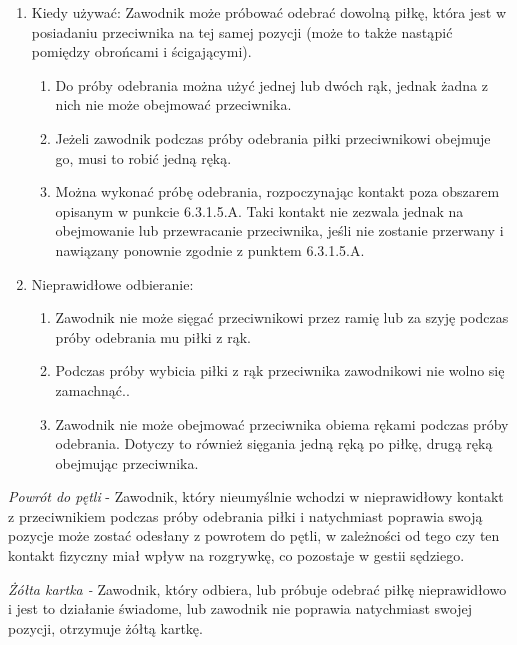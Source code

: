 \documentclass[12pt]{article}
\begin{document}
\begin{enumerate}
	\item
	      Kiedy używać: Zawodnik może próbować odebrać dowolną piłkę, która jest
	      w posiadaniu przeciwnika na tej samej pozycji (może to także nastąpić
	      pomiędzy obrońcami i ścigającymi).

	      \begin{enumerate}
		      \item
		            Do próby odebrania można użyć jednej lub dwóch rąk, jednak żadna z
		            nich nie może obejmować przeciwnika.
		      \item
		            Jeżeli zawodnik podczas próby odebrania piłki przeciwnikowi obejmuje
		            go, musi to robić jedną ręką.
		      \item
		            Można wykonać próbę odebrania, rozpoczynając kontakt poza obszarem
		            opisanym w punkcie 6.3.1.5.A. Taki kontakt nie zezwala jednak na
		            obejmowanie lub przewracanie przeciwnika, jeśli nie zostanie
		            przerwany i nawiązany ponownie zgodnie z punktem 6.3.1.5.A.
	      \end{enumerate}
	\item
	      Nieprawidłowe odbieranie:

	      \begin{enumerate}
		      \item
		            Zawodnik nie może sięgać przeciwnikowi przez ramię lub za szyję
		            podczas próby odebrania mu piłki z rąk.
		      \item
		            Podczas próby wybicia piłki z rąk przeciwnika zawodnikowi nie wolno
		            się zamachnąć..
		      \item
		            Zawodnik nie może obejmować przeciwnika obiema rękami podczas próby
		            odebrania. Dotyczy to również sięgania jedną ręką po piłkę, drugą
		            ręką obejmując przeciwnika.
	      \end{enumerate}
\end{enumerate}

\emph{Powrót do pętli} - Zawodnik, który nieumyślnie wchodzi w
nieprawidłowy kontakt z przeciwnikiem podczas próby odebrania piłki i
natychmiast poprawia swoją pozycje może zostać odesłany z powrotem do
pętli, w zależności od tego czy ten kontakt fizyczny miał wpływ na
rozgrywkę, co pozostaje w gestii sędziego.

\emph{Żółta kartka -} Zawodnik, który odbiera, lub próbuje odebrać piłkę
nieprawidłowo i jest to działanie świadome, lub zawodnik nie poprawia
natychmiast swojej pozycji, otrzymuje żółtą kartkę.
\end{document}
